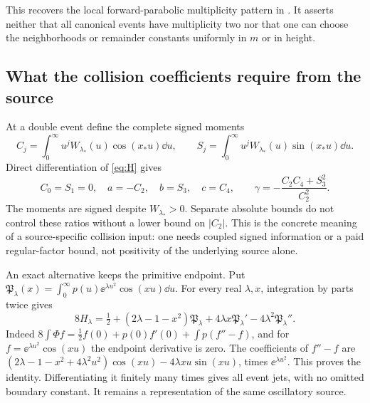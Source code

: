 This recovers the local forward-parabolic multiplicity pattern in
\cite{Angenent1991,HeatMultiplicity}. It asserts neither that all
canonical events have multiplicity two nor that one can choose the neighborhoods
or remainder constants uniformly in \(m\) or in height.

\subsection{What the collision coefficients require from the source}
At a double event define the complete signed moments
\[
 C_j=\int_0^\infty u^jW_{\lambda_*}(u)\cos(x_*u)\dd u,
 \qquad S_j=\int_0^\infty u^jW_{\lambda_*}(u)\sin(x_*u)\dd u.
\]
Direct differentiation of \eqref{eq:H} gives
\begin{equation}\label{eq:collision-source-moments}
 C_0=S_1=0,\quad a=-C_2,\quad b=S_3,\quad c=C_4,
 \qquad \gamma=-\frac{C_2C_4+S_3^2}{C_2^2}.
\end{equation}
The moments are signed despite \(W_{\lambda_*}>0\). Separate absolute
bounds do not control these ratios without a lower bound on \(|C_2|\).
This is the concrete meaning of a source-specific collision input:
one needs coupled signed information or a paid regular-factor bound,
not positivity of the underlying source alone.

An exact alternative keeps the primitive endpoint. Put
\(\mathfrak P_\lambda(x)=\int_0^\infty p(u)\ee^{\lambda u^2}\cos(xu)\dd u\).
For every real \(\lambda,x\), integration by parts twice gives
\begin{equation}\label{eq:all-time-primitive}
 8H_\lambda=\tfrac12+(2\lambda-1-x^2)\mathfrak P_\lambda
       +4\lambda x\mathfrak P_\lambda'-4\lambda^2\mathfrak P_\lambda''.
\end{equation}
Indeed \(8\int\Phi f=\tfrac12 f(0)+p(0)f'(0)+\int p(f''-f)\),
and for \(f=\ee^{\lambda u^2}\cos(xu)\) the endpoint derivative is zero.
The coefficients of \(f''-f\) are
\((2\lambda-1-x^2+4\lambda^2u^2)\cos(xu)-4\lambda xu\sin(xu)\),
times \(\ee^{\lambda u^2}\). This proves the identity. Differentiating
it finitely many times gives all event jets, with no omitted boundary
constant. It remains a representation of the same oscillatory source.

